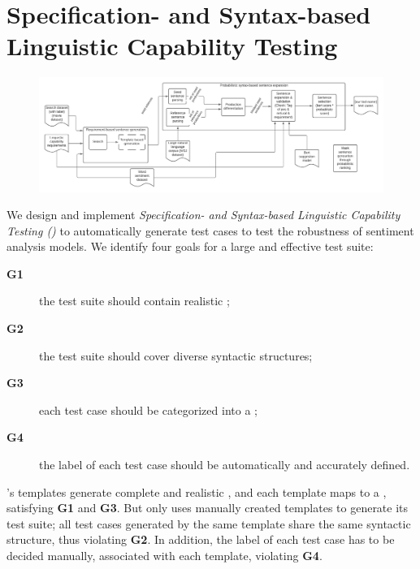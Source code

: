 \section{Specification- and Syntax-based Linguistic Capability Testing}

\begin{figure}
  \centering
  \includegraphics[width=\linewidth]{figs/overview.pdf}
  \caption{\OverviewFigCaption}
\end{figure}

  We design and implement
\emph{Specification- and Syntax-based Linguistic Capability Testing
  (\tool{})} to automatically generate test cases to test the
robustness of sentiment analysis models. We identify four goals for a
large and effective test suite:

\begin{description}
\item[{\bf G1}] the test suite should contain realistic \sents;
\item[{\bf G2}] the test suite should cover diverse syntactic structures;
  \item[{\bf G3}] each test case should be
categorized into a \lc;
\item[{\bf G4}] the label of each test case should be
automatically and accurately defined.
\end{description}

\Chlst's templates generate complete and realistic \sents, and each
template maps to a \lc, satisfying {\bf G1} and {\bf
  G3}. But \Chlst only uses  manually created templates to
generate its test suite; all test cases generated by the same template
share the same syntactic structure, thus violating {\bf G2}. In
addition, the label of each \Chlst test case has to be decided
manually, associated with each template, violating {\bf G4}.

